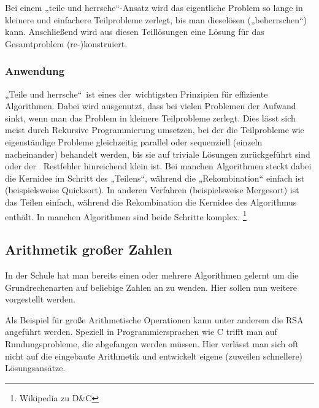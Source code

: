 Bei einem „teile und herrsche“-Ansatz wird das eigentliche Problem so lange in kleinere und einfachere Teilprobleme zerlegt, bis man diese\linebreak lösen („beherrschen“) kann. Anschließend wird aus diesen Teillösungen eine Lösung für das Gesamtproblem (re-)konstruiert.
\subsubsection{Anwendung}
„Teile und herrsche“ \,ist eines der \,wichtigsten Prinzipien für effiziente Algorithmen. Dabei wird ausgenutzt, dass bei vielen Problemen der Aufwand sinkt, wenn man das Problem in kleinere Teilprobleme zerlegt. Dies lässt sich meist durch Rekursive Programmierung umsetzen, bei der die Teilprobleme wie eigenständige Probleme gleichzeitig parallel oder sequenziell (einzeln nacheinander) behandelt werden, bis sie auf triviale Lö\-sungen zurückgeführt sind oder der \, Restfehler hinreichend klein ist. Bei manchen Algorithmen steckt dabei die Kernidee im Schritt des „Teilens“, während die „Rekombination“ einfach ist (beispielsweise Quicksort). In anderen \linebreak Verfahren (beispielsweise Mergesort) ist das Teilen einfach, während die Rekombination die Kernidee des Algorithmus enthält. In manchen Algorithmen sind beide Schritte komplex.
\footnote[1]{Wikipedia zu D\&C}
\subsection{Arithmetik großer Zahlen}
In der Schule hat man bereits einen oder mehrere Algorithmen gelernt um die Grundrechenarten auf beliebige Zahlen an zu wenden. Hier sollen nun weitere vorgestellt werden.

Als Beispiel für große Arithmetische Operationen kann unter anderem die RSA angeführt werden. Speziell in Programmiersprachen wie C trifft man auf Rundungsprobleme, die abgefangen werden müssen. Hier verlässt man sich oft nicht auf die eingebaute Arithmetik und entwickelt eigene (zuweilen schnellere) Lösungsansätze.

